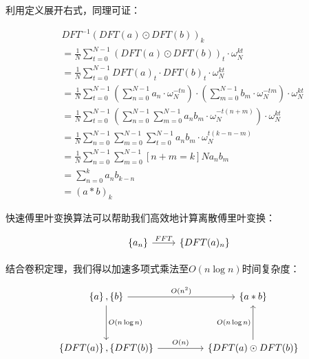 \documentclass[UTF8]{book}
\begin{document}
利用定义展开右式，同理可证：
\begin{large}
    \begin{equation}
        \begin{aligned}
            &DFT^{-1}\left ( DFT(a) \odot DFT(b) \right )_k \\
            &= \frac{1}{N}\sum_{t=0}^{N-1}\left ( DFT(a) \odot DFT(b) \right )_t \cdot \omega_N^{kt}\\
            &= \frac{1}{N}\sum_{t=0}^{N-1} DFT(a)_t \cdot DFT(b)_t \cdot \omega_N^{kt} \\
            &= \frac{1}{N}\sum_{t=0}^{N-1} \left ( \sum_{n=0}^{N-1}{a_n \cdot \omega_{N}^{-tn}} \right ) \cdot \left ( \sum_{m=0}^{N-1}{b_m \cdot \omega_{N}^{-tm}} \right ) \cdot \omega_N^{kt} \\
            &= \frac{1}{N}\sum_{t=0}^{N-1} \left ( \sum_{n=0}^{N-1}\sum_{m=0}^{N-1}a_nb_m \cdot \omega_N^{-t(n+m)} \right ) \cdot \omega_N^{kt} \\
            &= \frac{1}{N}\sum_{n=0}^{N-1}\sum_{m=0}^{N-1}\sum_{t=0}^{N-1}a_nb_m \cdot \omega_N^{t(k-n-m)} \\
            &= \frac{1}{N}\sum_{n=0}^{N-1}\sum_{m=0}^{N-1}\left [ n+m=k \right ]Na_nb_m \\
            &= \sum_{n=0}^{k}a_nb_{k-n} \\
            &= (a*b)_k
            \nonumber
        \end{aligned}
    \end{equation}
\end{large}
快速傅里叶变换算法可以帮助我们高效地计算离散傅里叶变换：
\begin{large}
    \begin{equation}
        \begin{aligned}
            \begin{tikzcd}
                \left \{ a_n \right \} \arrow[r,"FFT"] & \left \{ DFT(a)_n \right \}
            \end{tikzcd}
            \nonumber
        \end{aligned}
    \end{equation}
\end{large}
结合卷积定理，我们得以加速多项式乘法至$O(n\log n)$时间复杂度：
\begin{large}
    \begin{equation}
        \begin{aligned}
            \begin{tikzcd}
                \left \{ a \right \}, \left \{ b \right \} \arrow[dd,"O(n\log n)"] \arrow[rr,"O(n^2)"] & & \left \{ a*b \right \} \\
                & & \\
                \left \{ DFT(a) \right \}, \left \{ DFT(b) \right \} \arrow[rr,"O(n)"] & & \left \{ DFT(a) \odot DFT(b) \right \} \arrow[uu,"O(n\log n)"]
            \end{tikzcd}
            \nonumber
        \end{aligned}
    \end{equation}
\end{large}
\end{document}
